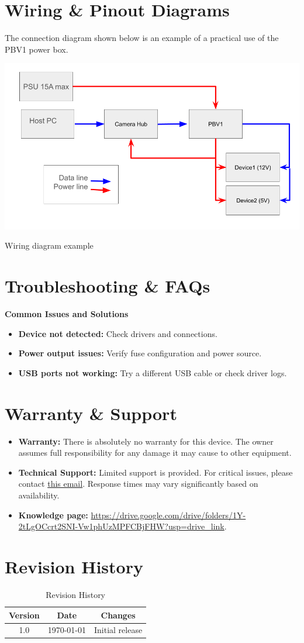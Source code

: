 \documentclass[a4paper,10pt,twocolumn]{article}
\begin{document}
\section*{Wiring \& Pinout Diagrams}
The connection diagram shown below is an example of a practical use of the PBV1 power box. 
\begin{center}
   \includegraphics[width=\columnwidth]{figures/ConnectionDiagram.png} %
   \caption{Wiring diagram example}
\end{center}


\section*{Troubleshooting \& FAQs}
\textbf{Common Issues and Solutions}
\begin{itemize}
    \item \textbf{Device not detected:} Check drivers and connections.
    \item \textbf{Power output issues:} Verify fuse configuration and power source.
    \item \textbf{USB ports not working:} Try a different USB cable or check driver logs.
\end{itemize}

\section*{Warranty \& Support}
\begin{itemize}
    \item \textbf{Warranty:} There is absolutely no warranty for this device. The owner assumes full responsibility for any damage it may cause to other equipment.
    \item \textbf{Technical Support:} Limited support is provided. For critical issues, please contact \href{mailto:gcoreos@gmail.com}{this email}. Response times may vary significantly based on availability.
    \item \textbf{Knowledge page:} \url{https://drive.google.com/drive/folders/1Y-2tLgOCcrt2SNI-Vw1phUzMPFCBjFHW?usp=drive_link}.
\end{itemize}
\section*{Revision History}
\begin{table}[h]
    \centering
    \begin{tabular}{|c|c|c|}
    \hline
    Version & Date & Changes \\
    \hline
    1.0 & \today & Initial release \\
    \hline
    \end{tabular}
    \caption{Revision History}
\end{table}
\end{document}
